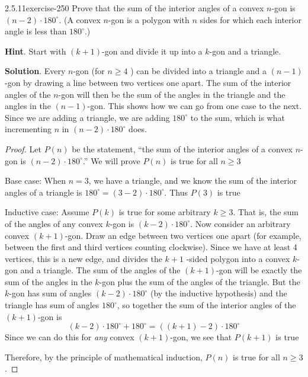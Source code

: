 \documentclass[twoside,11pt,]{book}
\numberwithin{equation}{chapter}
\begin{document}
\begin{divisionsolution}{2.5.11}{}{exercise-250}%
\hypertarget{p-3630}{}%
Prove that the sum of the interior angles of a convex \(n\)-gon is \((n-2)\cdot 180^\circ\). (A convex \(n\)-gon is a polygon with \(n\) sides for which each interior angle is less than \(180^\circ\).)%
\par\smallskip%
\noindent\textbf{Hint}.\quad%
\hypertarget{p-3631}{}%
Start with \((k+1)\)-gon and divide it up into a \(k\)-gon and a triangle.%
\par\smallskip%
\noindent\textbf{Solution}.\quad%
\hypertarget{p-3632}{}%
Every \(n\)-gon (for \(n \ge 4\) ) can be divided into a triangle and a \((n-1)\)-gon by drawing a line between two vertices one apart. The sum of the interior angles of the \(n\)-gon will then be the sum of the angles in the triangle and the angles in the \((n-1)\)-gon. This shows how we can go from one case to the next. Since we are adding a triangle, we are adding \(180^\circ\) to the sum, which is what incrementing \(n\) in \((n-2)\cdot 180^\circ\) does.%
\begin{proof}{}
\hypertarget{p-3633}{}%
Let \(P(n)\) be the statement, ``the sum of the interior angles of a convex \(n\)-gon is \((n-2)\cdot 180^\circ\).'' We will prove \(P(n)\) is true for all \(n \ge 3\)%
\par
\hypertarget{p-3634}{}%
Base case: When \(n=3\), we have a triangle, and we know the sum of the interior angles of a triangle is \(180^\circ = (3-2)\cdot 180^\circ\). Thus \(P(3)\) is true%
\par
\hypertarget{p-3635}{}%
Inductive case: Assume \(P(k)\) is true for some arbitrary \(k \ge 3\). That is, the sum of the angles of any convex \(k\)-gon is \((k-2)\cdot 180^\circ\). Now consider an arbitrary convex \((k+1)\)-gon. Draw an edge between two vertices one apart (for example, between the first and third vertices counting clockwise). Since we have at least 4 vertices, this is a new edge, and divides the \(k+1\) -sided polygon into a convex \(k\)-gon and a triangle. The sum of the angles of the \((k+1)\)-gon will be exactly the sum of the angles in the \(k\)-gon plus the sum of the angles of the triangle. But the \(k\)-gon has sum of angles \((k-2)\cdot 180^\circ\) (by the inductive hypothesis) and the triangle has sum of angles \(180^\circ\), so together the sum of the interior angles of the \((k+1)\)-gon is%
\begin{equation*}
(k-2)\cdot 180^\circ + 180^\circ = ((k+1)-2)\cdot 180^\circ
\end{equation*}
Since we can do this for \emph{any} convex \((k+1)\)-gon, we see that \(P(k+1)\) is true%
\par
\hypertarget{p-3636}{}%
Therefore, by the principle of mathematical induction, \(P(n)\) is true for all \(n\ge 3\).%
\end{proof}
\end{divisionsolution}%
\end{document}
